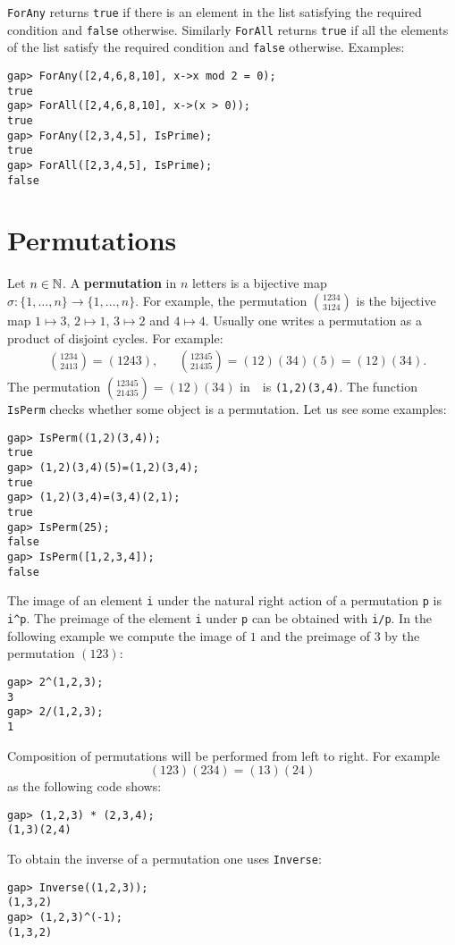 \lstinline{ForAny} returns \lstinline{true} if there is an element in the list 
satisfying the required condition and 
\lstinline{false} otherwise. 
Similarly 
\lstinline{ForAll} returns \lstinline{true} if all the
elements of the list satisfy the required condition and 
\lstinline{false} otherwise. Examples:
\begin{lstlisting}
gap> ForAny([2,4,6,8,10], x->x mod 2 = 0);
true
gap> ForAll([2,4,6,8,10], x->(x > 0));
true
gap> ForAny([2,3,4,5], IsPrime);
true
gap> ForAll([2,3,4,5], IsPrime);
false
\end{lstlisting}

\section{Permutations}
\label{permutations}

Let $n\in\mathbb{N}$. A \textbf{permutation} in $n$ letters is a bijective map
$\sigma\colon\{1,\dots,n\}\to\{1,\dots,n\}$. For example, the permutation
$\binom{1234}{3124}$ is the bijective map $1\mapsto 3$, $2\mapsto 1$,
$3\mapsto 2$ and $4\mapsto 4$. 
Usually one writes a permutation as a product of disjoint cycles. For example:
\begin{align*}
&\binom{1234}{2413}=(1243),
&&\binom{12345}{21435}=(12)(34)(5)=(12)(34).
\end{align*}
The permutation $\binom{12345}{21435}=(12)(34)$ in~\GAP~is 
\lstinline{(1,2)(3,4)}.  The function \lstinline{IsPerm} checks whether 
some object is a permutation. Let us see some examples:
\begin{lstlisting}
gap> IsPerm((1,2)(3,4));
true
gap> (1,2)(3,4)(5)=(1,2)(3,4);
true
gap> (1,2)(3,4)=(3,4)(2,1);
true
gap> IsPerm(25);
false
gap> IsPerm([1,2,3,4]);
false
\end{lstlisting}


The image of an element \lstinline{i} under the natural right action of a
permutation \lstinline{p} is \lstinline{i^p}. The preimage of the element
\lstinline{i} under \lstinline{p} can be obtained with \lstinline{i/p}. In the
following example we compute the image of $1$ and the preimage of $3$ by the
permutation $(123)$: 
\begin{lstlisting}
gap> 2^(1,2,3);
3
gap> 2/(1,2,3);
1
\end{lstlisting}
Composition of permutations will be performed from left to right. For example
\[
  (123)(234)=(13)(24)
\]
as the following code shows: 
\begin{lstlisting}
gap> (1,2,3) * (2,3,4);
(1,3)(2,4)
\end{lstlisting}
To obtain the inverse of a permutation one uses 
\lstinline{Inverse}: 
\begin{lstlisting}
gap> Inverse((1,2,3));
(1,3,2)
gap> (1,2,3)^(-1);
(1,3,2)
\end{lstlisting}

